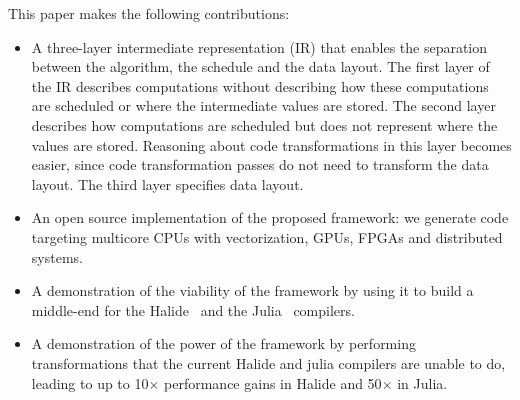 
This paper makes the following contributions:
\begin{itemize}
  \item A three-layer intermediate representation (IR) that enables the separation between the algorithm, the schedule and the data layout. The first layer of the IR describes computations without describing how these computations are scheduled or where the intermediate values are stored.  The second layer describes how computations are scheduled but does not represent where the values are stored.  Reasoning about code transformations in this layer becomes easier, since code transformation passes do not need to transform the data layout.  The third layer specifies data layout.
  \item An open source implementation of the proposed framework: we generate code targeting multicore CPUs with vectorization, GPUs, FPGAs and distributed systems.
  \item A demonstration of the viability of the framework by using it to build a middle-end for the Halide~\cite{halide_12,DBLP:conf/pldi/Ragan-KelleyBAPDA13} and the Julia~\cite{bezanson2017julia} compilers.
  \item A demonstration of the power of the framework by performing transformations that the current Halide and julia compilers are unable to do, leading to up to 10$\times$ performance gains in Halide and 50$\times$ in Julia.
\end{itemize}
